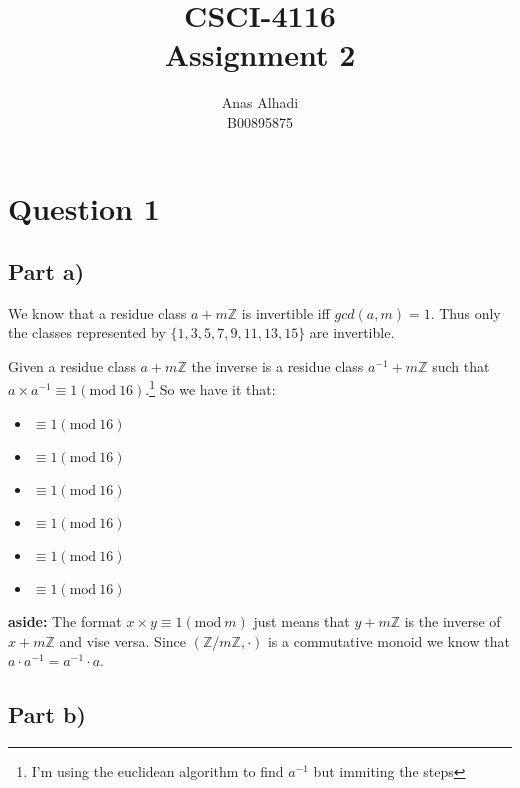 \documentclass{article}
\title{\textbf{CSCI-4116\\Assignment 2}}
\author{Anas Alhadi\\B00895875}
\numberwithin{equation}{subsection}
\begin{document}
	\maketitle

	

	\vspace{25pt}
	\section*{Question 1}
	\subsection*{Part a)}	
	\par{
		We know that a residue class $a+m\mathbb{Z}$ is invertible iff $gcd(a,m)=1$.
		Thus only the classes represented by $\{1,3,5,7,9,11,13,15\}$ are invertible.}
	\par{
		Given a residue class $a+m\mathbb{Z}$ the inverse is a residue class 
		$a^{-1}+m\mathbb{Z}$ such that $a \times a^{-1} \equiv 1(\textrm{mod}\ 16)$.\footnote{I'm using the euclidean algorithm 
		to find $a^{-1}$ but immiting the steps}
		So we have it that:
	}

	\begin{itemize}[]
		\item{}  $\equiv 1(\textrm{mod}\ 16)$	
		\item{}  $\equiv 1(\textrm{mod}\ 16)$	
		\item{}  $\equiv 1(\textrm{mod}\ 16)$	
		\item{}  $\equiv 1(\textrm{mod}\ 16)$	
		\item{}  $\equiv 1(\textrm{mod}\ 16)$	
		\item{}  $\equiv 1(\textrm{mod}\ 16)$	
	\end{itemize}

	\textbf{aside:}
	The format $x \times y \equiv 1(\textrm{mod}\ m)$ just means that
	$y+m\mathbb{Z}$ is the inverse of $x+m\mathbb{Z}$ and vise versa. Since $(\mathbb{Z}/m\mathbb{Z}, \cdot)$ is a commutative monoid
	we know that $a\cdot a^{-1} = a^{-1}\cdot a$.

	\newpage
	\thispagestyle{fancy}


	\subsection*{Part b)}
\end{document}
